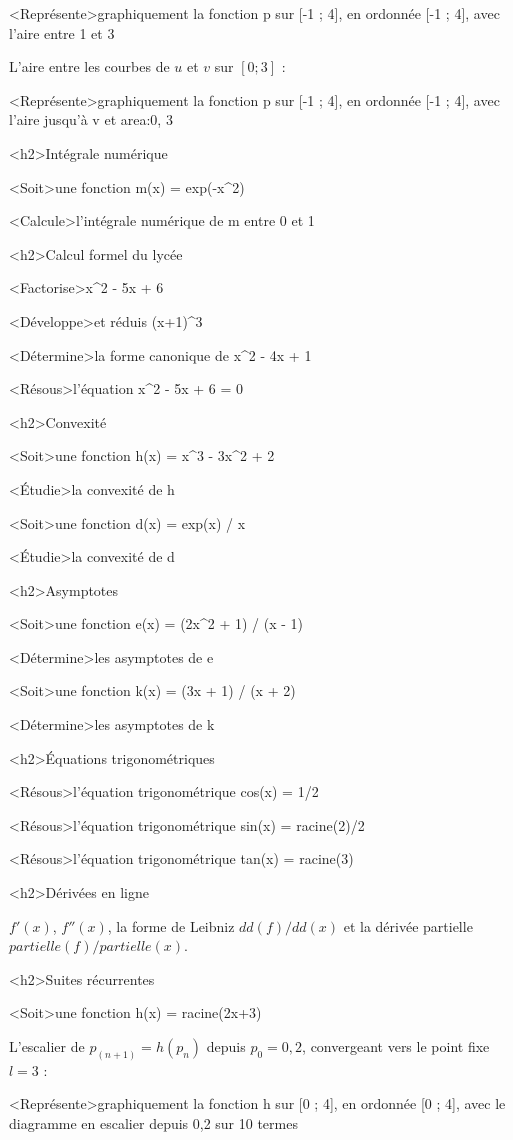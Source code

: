 \documentclass[marges=20, taille=11, precision=3]{texecole}
\begin{document}
<Représente>graphiquement la fonction p sur [-1 ; 4], en ordonnée [-1 ; 4], avec l'aire entre 1 et 3

L'aire entre les courbes de $u$ et $v$ sur $[0 ; 3]$ :

<Représente>graphiquement la fonction p sur [-1 ; 4], en ordonnée [-1 ; 4], avec l'aire jusqu'à v et area:{0, 3}

<h2>Intégrale numérique

<Soit>une fonction m(x) = exp(-x^2)

<Calcule>l'intégrale numérique de m entre 0 et 1

<h2>Calcul formel du lycée

<Factorise>x^2 - 5x + 6

<Développe>et réduis (x+1)^3

<Détermine>la forme canonique de x^2 - 4x + 1

<Résous>l'équation x^2 - 5x + 6 = 0

<h2>Convexité

<Soit>une fonction h(x) = x^3 - 3x^2 + 2

<Étudie>la convexité de h

<Soit>une fonction d(x) = exp(x) / x

<Étudie>la convexité de d

<h2>Asymptotes

<Soit>une fonction e(x) = (2x^2 + 1) / (x - 1)

<Détermine>les asymptotes de e

<Soit>une fonction k(x) = (3x + 1) / (x + 2)

<Détermine>les asymptotes de k

<h2>Équations trigonométriques

<Résous>l'équation trigonométrique cos(x) = 1/2

<Résous>l'équation trigonométrique sin(x) = racine(2)/2

<Résous>l'équation trigonométrique tan(x) = racine(3)

<h2>Dérivées en ligne

$f'(x)$, $f''(x)$, la forme de Leibniz $dd(f)/dd(x)$ et la dérivée partielle $partielle(f)/partielle(x)$.

<h2>Suites récurrentes

<Soit>une fonction h(x) = racine(2x+3)

L'escalier de $p_(n+1) = h(p_n)$ depuis $p_0 = 0,2$, convergeant vers le point fixe $l = 3$ :

<Représente>graphiquement la fonction h sur [0 ; 4], en ordonnée [0 ; 4], avec le diagramme en escalier depuis 0,2 sur 10 termes
\end{document}
